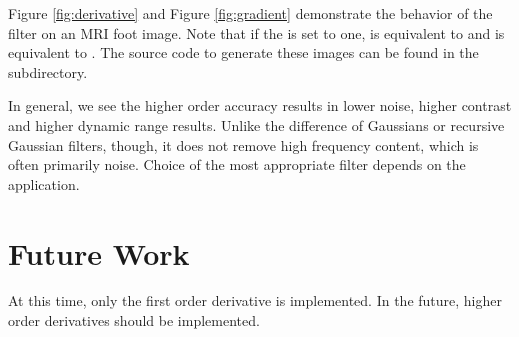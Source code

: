 \documentclass{InsightArticle}
\begin{document}
Figure \ref{fig:derivative} and Figure \ref{fig:gradient} demonstrate the behavior of the filter on an MRI foot
image.  Note that if the  is set to one,
 is equivalent to
 and
 is equivalent to
.  The source code to generate
these images can be found in the  subdirectory.

In general, we see the higher order accuracy results in lower noise, higher
contrast and higher dynamic range results.  Unlike the difference of Gaussians
or recursive Gaussian filters, though, it does not remove high frequency
content, which is often primarily noise.  Choice of the most appropriate filter
depends on the application.

\section{Future Work}

At this time, only the first order derivative is implemented.  In the future,
higher order derivatives should be implemented.



\end{document}
